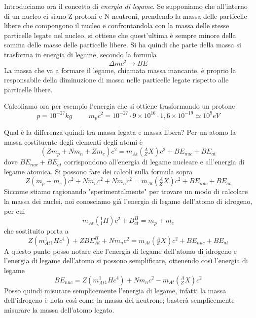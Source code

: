 Introduciamo ora il concetto di \emph{energia di legame}. 
Se supponiamo che all'interno di un nucleo ci siano Z protoni e N neutroni, prendendo la massa delle particelle libere che compongono il nucleo e confrontandola con la massa delle stesse particelle legate nel nucleo, si ottiene che quest'ultima è sempre minore della somma delle masse delle particelle libere.
Si ha quindi che parte della massa si trasforma in energia di legame, secondo la formula 
\begin{equation}
\Delta m c^2 \to BE
\end{equation}
La massa che va a formare il legame, chiamata massa mancante, è proprio la responsabile della diminuzione di massa nelle particelle legate rispetto alle particelle libere.

Calcoliamo ora per esempio l'energia che si ottiene trasformando un protone
\begin{equation}
p=10^{-27}kg\hspace{1cm} m_pc^2= 10^{-27}\cdot 9\times10^{16}\cdot 1,6\times10^{-19}\simeq 10^9 eV
\end{equation}

Qual è la differenza quindi tra massa legata e massa libera?
Per un atomo la massa costituente degli elementi degli atomi è
\begin{equation}
(Zm_p+Nm_n+Zm_e)c^2=m_{At}(^A_ZX)c^2+BE_{nuc}+BE_{at}
\end{equation}
dove $BE_{nuc}+BE_{at}$ corrispondono all'energia di legame nucleare e all'energia di legame atomica.
Si possono fare dei calcoli sulla formula sopra
\begin{equation}
Z(m_p+m_e)c^2+Nm_nc^2+Nm_nc^2=m_{At}(^A_ZX)c^2+BE_{nuc}+BE_{at}
\end{equation}
Siccome stiamo ragionando "sperimentalmente" per trovare un modo di calcolare la massa dei nuclei, noi conosciamo già l'energia di legame dell'atomo di idrogeno, per cui
\begin{equation}
m_{At}(^1_1H)c^2+B_{at}^H=m_p+m_e
\end{equation}
che sostituito porta a 
\begin{equation}
Z({m_{At}^1} {_1H c^4})+ZBE^H_{At}+Nm_nc^2=m_{At}(^A_ZX)c^2+BE_{nuc}+BE_{at}
\end{equation}
A questo punto posso notare che l'energia di legame dell'atomo di idrogeno e l'energia di legame dell'atomo si possono semplificare, ottenendo così l'energia di legame
\begin{equation}
BE_{nuc}=Z(m_{At}^1{_1Hc^4})+Nm_nc^2-m_{At}(^A_ZX)c^2
\end{equation}
Posso quindi misurare semplicemente l'energia di legame, infatti la massa dell'idrogeno è nota così come la massa del neutrone; basterà semplicemente misurare la massa dell'atomo legato.

